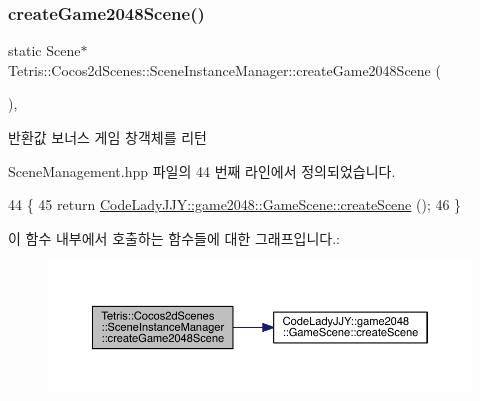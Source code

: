\subsubsection{\texorpdfstring{create\+Game2048\+Scene()}{createGame2048Scene()}}
{\footnotesize\ttfamily static Scene$\ast$ Tetris\+::\+Cocos2d\+Scenes\+::\+Scene\+Instance\+Manager\+::create\+Game2048\+Scene (\begin{DoxyParamCaption}{ }\end{DoxyParamCaption})\hspace{0.3cm}{\ttfamily [inline]}, {\ttfamily [static]}}

\begin{DoxyReturn}{반환값}
보너스 게임 창객체를 리턴 
\end{DoxyReturn}


Scene\+Management.\+hpp 파일의 44 번째 라인에서 정의되었습니다.


\begin{DoxyCode}
44                                            \{
45             \textcolor{keywordflow}{return} \hyperlink{class_code_lady_j_j_y_1_1game2048_1_1_game_scene_ab573bac307156883fc8c632821b061e4}{CodeLadyJJY::game2048::GameScene::createScene}
      ();
46         \}
\end{DoxyCode}
이 함수 내부에서 호출하는 함수들에 대한 그래프입니다.\+:
\nopagebreak
\begin{figure}[H]
\begin{center}
\leavevmode
\includegraphics[width=350pt]{d1/d6f/class_tetris_1_1_cocos2d_scenes_1_1_scene_instance_manager_a271e373f7a835b2e8dcec0a69be4f849_cgraph}
\end{center}
\end{figure}
\mbox{\label{class_tetris_1_1_cocos2d_scenes_1_1_scene_instance_manager_a7dad1373db969d5c882e2cdc46f7933a}} 
